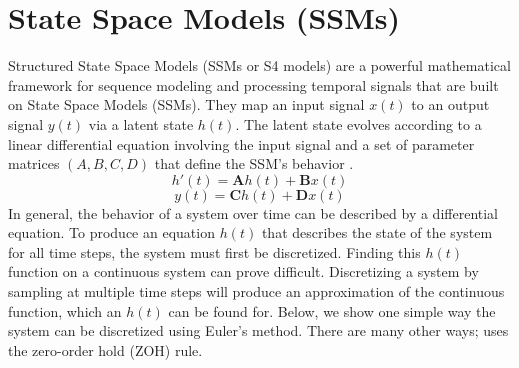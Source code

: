 \documentclass[conference]{IEEEtran}
\begin{document}
\section{State Space Models (SSMs)}
Structured State Space Models (SSMs or S4 models) are a powerful mathematical framework for sequence modeling and processing temporal signals that are built on State Space Models (SSMs). They map an input signal $x(t)$ to an output signal $y(t)$ via a latent state $h(t)$. The latent state evolves according to a linear differential equation involving the input signal and a set of parameter matrices $(A, B, C, D)$ that define the SSM's behavior \cite{gu2022efficiently}.
\begin{equation}\label{eq:SSMlatent}
    h'(t) = \mathbf{A}h(t) + \mathbf{B}x(t)
\end{equation}
\begin{equation}\label{eq:SSMoutput}
    y(t) = \mathbf{C}h(t) + \mathbf{D}x(t)
\end{equation}
In general, the behavior of a system over time can be described by a differential equation. To produce an equation $h(t)$ that describes the state of the system for all time steps, the system must first be discretized. Finding this $h(t)$ function on a continuous system can prove difficult. Discretizing a system by sampling at multiple time steps will produce an approximation of the continuous function, which an $h(t)$ can be found for. Below, we show one simple way the system can be discretized using Euler's method. There are many other ways; \cite{gu2023mamba} uses the zero-order hold (ZOH) rule.
\end{document}
